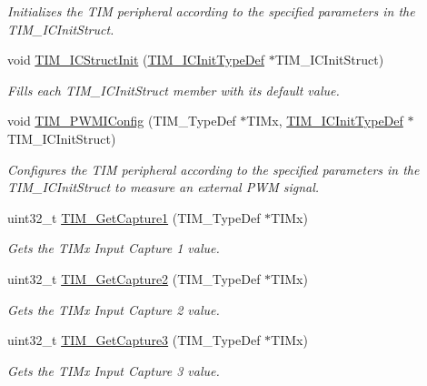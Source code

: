 \begin{DoxyCompactItemize}
\begin{DoxyCompactList}\small\item\em Initializes the T\-I\-M peripheral according to the specified parameters in the T\-I\-M\-\_\-\-I\-C\-Init\-Struct. \end{DoxyCompactList}\item 
void \hyperlink{group___t_i_m_ga5005dac8e4e8a4c7fc2a0ef05b77cc50}{T\-I\-M\-\_\-\-I\-C\-Struct\-Init} (\hyperlink{struct_t_i_m___i_c_init_type_def}{T\-I\-M\-\_\-\-I\-C\-Init\-Type\-Def} $\ast$T\-I\-M\-\_\-\-I\-C\-Init\-Struct)
\begin{DoxyCompactList}\small\item\em Fills each T\-I\-M\-\_\-\-I\-C\-Init\-Struct member with its default value. \end{DoxyCompactList}\item 
void \hyperlink{group___t_i_m_gaa71f9296556310f85628d6c748a06475}{T\-I\-M\-\_\-\-P\-W\-M\-I\-Config} (T\-I\-M\-\_\-\-Type\-Def $\ast$T\-I\-Mx, \hyperlink{struct_t_i_m___i_c_init_type_def}{T\-I\-M\-\_\-\-I\-C\-Init\-Type\-Def} $\ast$T\-I\-M\-\_\-\-I\-C\-Init\-Struct)
\begin{DoxyCompactList}\small\item\em Configures the T\-I\-M peripheral according to the specified parameters in the T\-I\-M\-\_\-\-I\-C\-Init\-Struct to measure an external P\-W\-M signal. \end{DoxyCompactList}\item 
uint32\-\_\-t \hyperlink{group___t_i_m_ga6bd39ca543305ff0cd06fce0f678d94d}{T\-I\-M\-\_\-\-Get\-Capture1} (T\-I\-M\-\_\-\-Type\-Def $\ast$T\-I\-Mx)
\begin{DoxyCompactList}\small\item\em Gets the T\-I\-Mx Input Capture 1 value. \end{DoxyCompactList}\item 
uint32\-\_\-t \hyperlink{group___t_i_m_ga2524cb5db14e388fb7f20c99fb3d58a5}{T\-I\-M\-\_\-\-Get\-Capture2} (T\-I\-M\-\_\-\-Type\-Def $\ast$T\-I\-Mx)
\begin{DoxyCompactList}\small\item\em Gets the T\-I\-Mx Input Capture 2 value. \end{DoxyCompactList}\item 
uint32\-\_\-t \hyperlink{group___t_i_m_ga71ee9ce2c535ec0fb3fac5f9119221f7}{T\-I\-M\-\_\-\-Get\-Capture3} (T\-I\-M\-\_\-\-Type\-Def $\ast$T\-I\-Mx)
\begin{DoxyCompactList}\small\item\em Gets the T\-I\-Mx Input Capture 3 value. \end{DoxyCompactList}\item 

\end{DoxyCompactItemize}
